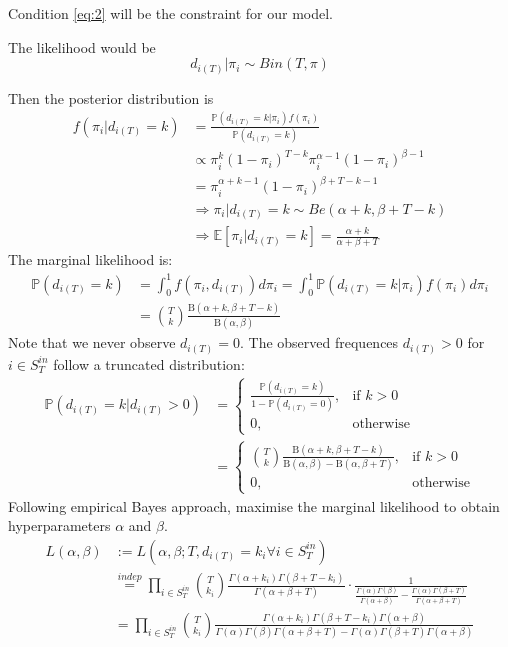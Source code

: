 \documentclass[a4paper, 12pt]{article}
\begin{document}
Condition \eqref{eq:2} will be the constraint for our model.

The likelihood would be
\begin{equation*}
    d_{i(T)} |\pi_i \sim Bin(T, \pi)
\end{equation*}

Then the posterior distribution is
\begin{align*}
    f(\pi_i | d_{i(T)} = k) &= \frac{\mathbb{P}(d_{i(T)} = k | \pi_i) f(\pi_i)}{\mathbb{P}(d_{i(T)} = k)} \\
    &\propto \pi_i^k(1 - \pi_i)^{T - k}\pi_i^{\alpha - 1}(1 - \pi_i)^{\beta - 1}\\
    &= \pi_i^{\alpha + k - 1}(1 - \pi_i)^{\beta + T - k - 1}\\
    &\Rightarrow \pi_i | d_{i(T)} = k \sim Be(\alpha + k, \beta + T - k)\\
    &\Rightarrow \mathbb{E}[\pi_i|d_{i(T)} = k] = \frac{\alpha + k}{\alpha + \beta + T}
\end{align*}
The marginal likelihood is:
\begin{align*}
    \mathbb{P}(d_{i(T)} = k) &= \int_0^1 f(\pi_i, d_{i(T)})d\pi_i = \int_0^1 \mathbb{P}(d_{i(T)} = k | \pi_i)f(\pi_i)d\pi_i\\
    &= \binom{T}{k} \frac{\mathrm{B}(\alpha + k, \beta + T - k)}{\mathrm{B}(\alpha, \beta)}
\end{align*}
Note that we never observe $d_{i(T)} = 0$. The observed frequences $d_{i(T)} > 0$ for $i \in S_{T}^{in}$ follow a truncated distribution:
\begin{align*}
\mathbb{P}(d_{i(T)} = k | d_{i(T)} > 0) &= 
\begin{cases}
    \frac{\mathbb{P}(d_{i(T)} = k)}{1 - \mathbb{P}(d_{i(T)} = 0)},& \text{if } k > 0 \\
    0, & \text{otherwise}
\end{cases}\\
&=
\begin{cases}
    \binom{T}{k} \frac{\mathrm{B}(\alpha + k, \beta + T - k)}{\mathrm{B}(\alpha, \beta) - \mathrm{B}(\alpha, \beta + T)},& \text{if } k > 0 \\
    0, & \text{otherwise}
\end{cases}
\end{align*}
Following empirical Bayes approach, maximise the marginal likelihood to obtain hyperparameters $\alpha$ and $\beta$.
\begin{align} \label{eq:3}
    L(\alpha, \beta) &:= L(\alpha, \beta; T, d_{i(T)} = k_i \forall i \in S_T^{in}) \nonumber \\
    &\overset{indep}{=} \prod_{i \in S_T^{in}} \binom{T}{k_i} \frac{\Gamma(\alpha + k_i)\Gamma(\beta + T - k_i)}{\Gamma(\alpha + \beta + T)} \cdot \frac{1}{\frac{\Gamma(\alpha)\Gamma(\beta)}{\Gamma(\alpha + \beta)} - \frac{\Gamma(\alpha)\Gamma(\beta + T)}{\Gamma(\alpha + \beta + T)}} \nonumber \\
    &= \prod_{i \in S_T^{in}} \binom{T}{k_i} \frac{\Gamma(\alpha + k_i)\Gamma(\beta + T - k_i)\Gamma(\alpha + \beta)}{\Gamma(\alpha)\Gamma(\beta)\Gamma(\alpha + \beta + T) - \Gamma(\alpha)\Gamma(\beta + T)\Gamma(\alpha + \beta)} \nonumber \\
\end{align}
\end{document}
